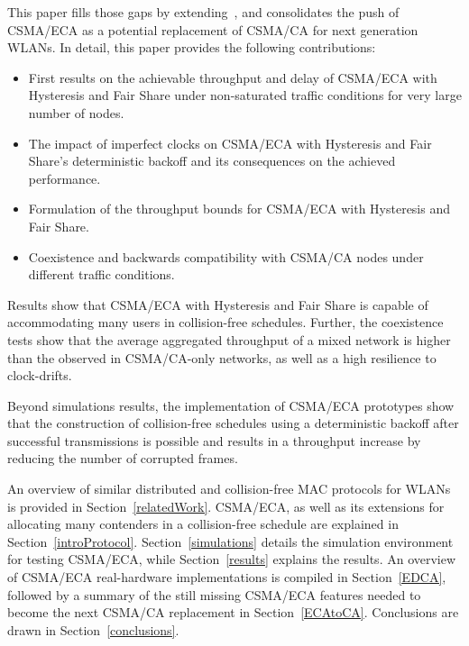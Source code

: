 \documentclass[a4paper,journal]{IEEEtran}
\begin{document}
This paper fills those gaps by extending~\cite{research2standards}, and consolidates the push of CSMA/ECA as a potential replacement of CSMA/CA for next generation WLANs. In detail, this paper provides the following contributions:

\begin{itemize}
	\item First results on the achievable throughput and delay of CSMA/ECA with Hysteresis and Fair Share under non-saturated traffic conditions for very large number of nodes.
	\item The impact of imperfect clocks on CSMA/ECA with Hysteresis and Fair Share's deterministic backoff and its consequences on the achieved performance.
	\item Formulation of the throughput bounds for CSMA/ECA with Hysteresis and Fair Share.
	\item Coexistence and backwards compatibility with CSMA/CA nodes under different traffic conditions.
\end{itemize}

Results show that CSMA/ECA with Hysteresis and Fair Share is capable of accommodating many users in collision-free schedules. Further, the coexistence tests show that the average aggregated throughput of a mixed network is higher than the observed in CSMA/CA-only networks, as well as a high resilience to clock-drifts.

Beyond simulations results, the implementation of CSMA/ECA prototypes\cite{ECA-DEMO-INFOCOM14, sanabria2013prototyping, BECA-test} show that the construction of collision-free schedules using a deterministic backoff after successful transmissions is possible and results in a throughput increase by reducing the number of corrupted frames.

An overview of similar distributed and collision-free MAC protocols for WLANs is provided in Section~\ref{relatedWork}. CSMA/ECA, as well as its extensions for allocating many contenders in a collision-free schedule are explained in Section~\ref{introProtocol}. Section~\ref{simulations} details the simulation environment for testing CSMA/ECA, while Section~\ref{results} explains the results. An overview of CSMA/ECA real-hardware implementations is compiled in Section~\ref{EDCA}, followed by a summary of the still missing CSMA/ECA features needed to become the next CSMA/CA replacement in Section~\ref{ECAtoCA}. Conclusions are drawn in Section~\ref{conclusions}.
\end{document}
